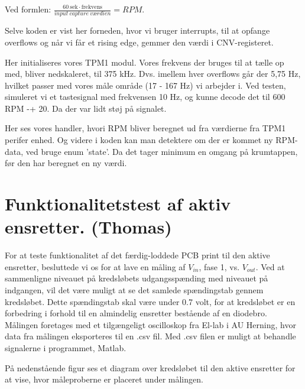 Ved formlen: $\frac{\mathrm{60\ sek}\cdot\mathrm{frekvens}}{input\ capture\ værdien} = RPM$.

Selve koden er vist her forneden, hvor vi bruger interrupts, til at opfange overflows og når vi får et rising edge, gemmer den værdi i CNV-registeret.



Her initialiseres vores TPM1 modul. Vores frekvens der bruges til at tælle op med, bliver nedskaleret, til 375 kHz. Dvs. imellem hver overflows går der 5,75 Hz, hvilket passer med vores måle område (17 - 167 Hz) vi arbejder i. 
Ved testen, simuleret vi et tastesignal med frekvensen 10 Hz, og kunne decode det til 600 RPM -+ 20. Da der var lidt støj på signalet.



Her ses vores handler, hvori RPM bliver beregnet ud fra værdierne fra TPM1 perifer enhed. Og videre i koden kan man detektere om der er kommet ny RPM-data, ved bruge enum ’state’. Da det tager minimum en omgang på krumtappen, før den har beregnet en ny værdi.
\clearpage

\section{Funktionalitetstest af aktiv ensretter. (Thomas)}
\label{sec:funkt-af-aktiv}

For at teste funktionalitet af det færdig-loddede PCB print til den aktive ensretter, besluttede vi os for at lave en måling af $V_{in}$, fase 1, vs. $V_{out}$. Ved at sammenligne niveauet på kredsløbets udgangsspænding med niveauet på indgangen, vil det være muligt at se det samlede spændingstab gennem kredsløbet. Dette spændingstab skal være under 0.7 volt, for at kredsløbet er en forbedring i forhold til en almindelig ensretter bestående af en diodebro. 
Målingen foretages med et tilgængeligt oscilloskop fra El-lab i AU Herning, hvor data fra målingen eksporteres til en .csv fil. Med .csv filen er muligt at behandle signalerne i programmet, Matlab.

På nedenstående figur ses et diagram over kredsløbet til den aktive ensretter for at vise, hvor måleproberne er placeret under målingen.

